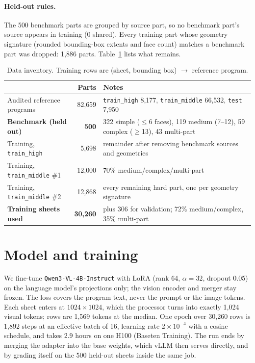 \documentclass[11pt]{article}
\begin{document}
\paragraph{Held-out rules.} The 500 benchmark parts are grouped by source part, so no benchmark part's source appears
in training (0 shared). Every training part whose geometry signature (rounded bounding-box extents and face count)
matches a benchmark part was dropped: 1{,}886 parts. Table~\ref{tab:data} lists what remains.

\begin{table}[h]
\centering\small
\begin{tabular}{lrl}
\toprule
& Parts & Notes \\
\midrule
Audited reference programs & 82{,}659 & \texttt{train\_high} 8{,}177, \texttt{train\_middle} 66{,}532, \texttt{test} 7{,}950 \\
\textbf{Benchmark (held out)} & \textbf{500} & 322 simple ($\le$6 faces), 119 medium (7--12), 59 complex ($\ge$13), 43 multi-part \\
Training, \texttt{train\_high} & 5{,}698 & remainder after removing benchmark sources and geometries \\
Training, \texttt{train\_middle} \#1 & 12{,}000 & 70\% medium/complex/multi-part \\
Training, \texttt{train\_middle} \#2 & 12{,}868 & every remaining hard part, one per geometry signature \\
\textbf{Training sheets used} & \textbf{30{,}260} & plus 306 for validation; 72\% medium/complex, 35\% multi-part \\
\bottomrule
\end{tabular}
\caption{Data inventory. Training rows are (sheet, bounding box) $\rightarrow$ reference program.}
\label{tab:data}
\end{table}

\section{Model and training}

We fine-tune \texttt{Qwen3-VL-4B-Instruct} with LoRA (rank 64, $\alpha=32$, dropout 0.05) on the language model's
projections only; the vision encoder and merger stay frozen. The loss covers the program text, never the prompt or
the image tokens. Each sheet enters at $1024\times1024$, which the processor turns into exactly 1{,}024 visual
tokens; rows are 1{,}569 tokens at the median. One epoch over 30{,}260 rows is 1{,}892 steps at an effective batch of
16, learning rate $2\times10^{-4}$ with a cosine schedule, and takes 2.9 hours on one H100 (Baseten Training). The
run ends by merging the adapter into the base weights, which vLLM then serves directly, and by grading itself on the
500 held-out sheets inside the same job.
\end{document}
